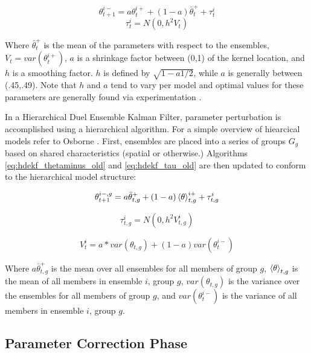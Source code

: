 \begin{equation}\label{eq:hdekf_thetaminus_old}
\theta_{t+1}^{i-} = a\theta_{t}^{i+} + (1-a)\bar{\theta}_{t}^{+} + \tau_{t}^{i}
\end{equation}
\begin{equation}\label{eq:hdekf_tau_old}
\tau_{t}^{i} = N(0, h^{2}V_{t})
\end{equation}

Where $\bar{\theta}_{t}^{+}$ is the mean of the parameters with respect to the ensembles, $V_{t} = var(\theta_{t}^{i+})$, $a$ is a shrinkage factor between (0,1) of the kernel location, and $h$ is a smoothing factor. $h$ is defined by $\sqrt{1-a1/2}$, while $a$ is generally between (.45,.49). Note that $h$ and $a$ tend to vary per model and optimal values for these parameters are generally found via experimentation  \cite{Moradkhani2005}  \cite{Anderson1999} \cite{Annan2005} \cite{Chen2008}.

In a Hierarchical Duel Ensemble Kalman Filter, parameter perturbation is accomplished using a hierarchical algorithm. For a simple overview of hiearcical models refer to Osborne \cite{Osborne2000}. First, ensembles are placed into a series of groups $G_{g}$ based on shared characteristics (spatial or otherwise.) Algorithms \eqref{eq:hdekf_thetaminus_old} and \eqref{eq:hdekf_tau_old} are then updated to conform to the hierarchical model structure:

\begin{equation}\label{eq:hdekf_theta}
\theta_{t+1}^{i-,g} = a \bar{\theta}_{t,g}^{+} + (1-a)\braket{\theta}_{t,g}^{i+} + \tau_{t,g}^{i}
\end{equation}

\begin{equation}\label{eq:hdekf_tau}
\tau_{t,g}^{i} = N(0, h^{2}V_{t,g}^{i})
\end{equation}

\begin{equation}\label{eq:hddekf_V}
V_{t}^{i} = a * var(\theta_{t,g}) + (1-a) var(\theta_{t}^{i-})
\end{equation}

Where $a \bar{\theta}_{t,g}^{+}$ is the mean over all ensembles for all members of group $g$, $\braket{\theta}_{t,g}$ is the mean of all members in ensemble $i$, group $g$, $var(\theta_{t,g})$ is the variance over the ensembles for all members of group $g$, and $var(\theta_{t}^{i-})$ is the variance of all members in ensemble $i$, group $g$.

\subsection{Parameter Correction Phase}

